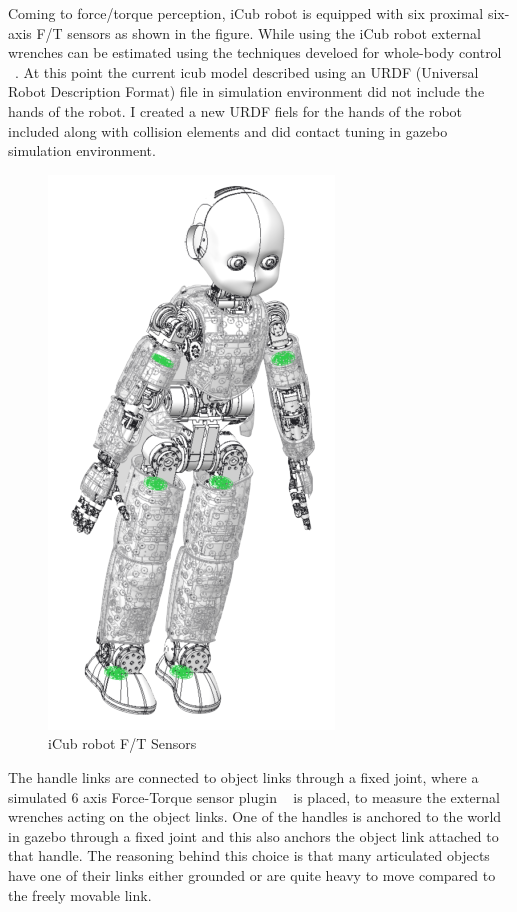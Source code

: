 \documentclass[12pt,a4paper]{report}
\begin{document}
Coming to force/torque perception, iCub robot is equipped with six proximal six-axis F/T sensors as shown in the figure. While using the iCub robot external wrenches can be estimated using the techniques develoed for whole-body control ~\cite{nori2015icub}. At this point the current icub model described using an URDF (Universal Robot Description Format) file in simulation environment did not include the hands of the robot. I created a new URDF fiels for the hands of the robot included along with collision elements and did contact tuning in gazebo simulation environment.

\begin{figure}[H]
  \centering
  \includegraphics[scale=0.5]{figures/icub_ft.png}
  \caption{iCub robot F/T Sensors}
  \label{icub_ft}
\end{figure}



The handle links are connected to object links through a fixed joint, where a simulated 6 axis Force-Torque sensor plugin ~\cite{hoffman2014yarp} is placed, to measure the external wrenches acting on the object links.  One of the handles is anchored to the world in gazebo through a fixed joint and this also anchors the object link attached to that handle. The reasoning behind this choice is that many articulated objects have one of their links either grounded or are quite heavy to move compared to the freely movable link. 
\end{document}
